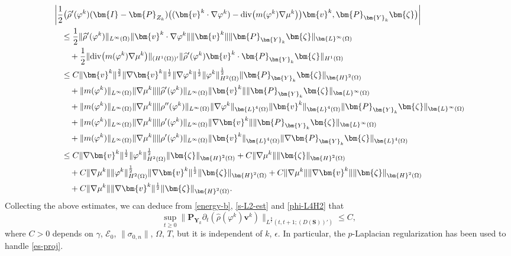 \documentclass[11pt,reqno]{amsart}
\def\be{\begin{equation}}
\def\ee{\end{equation}}
\def\div{\mathrm{div}}
\def\vv{\bm{v}}
\begin{document}
\begin{align}
&\left|\frac12\big(\widehat{\rho}'(\varphi^k)(\bm{I}-\bm{P}_{Z_{k}}) \big((\bm{v}^k\cdot\nabla\varphi^k)-\div \big(m(\varphi^k)\nabla \mu^k\big)\big)\vv^k,\bm{P}_{\bm{Y}_{k}}\bm{\zeta}\big)\right|
\notag\\
&\quad \leq \frac12 \|\widehat{\rho}'(\varphi^k)\|_{L^\infty(\Omega)} \|\bm{v}^k\cdot\nabla\varphi^k \| \|\vv^k\| \|\bm{P}_{\bm{Y}_{k}}\bm{\zeta}  \|_{\bm{L}^\infty(\Omega)}
\notag\\
&\qquad + \frac12 \| \div \big(m(\varphi^k)\nabla \mu^k\big) \|_{(H^1(\Omega))'} \|\widehat{\rho}'(\varphi^k)\vv^k\cdot \bm{P}_{\bm{Y}_{k}}\bm{\zeta}  \|_{H^1(\Omega)}
\notag\\
&\quad \leq C  \|\bm{v}^k\|^\frac32\|\nabla \vv^k\|^\frac12 \|\nabla \varphi^k\|^\frac12\|\varphi^k\|_{H^2(\Omega)}^\frac12 \|\bm{P}_{\bm{Y}_{k}}\bm{\zeta}\|_{\bm{H}^2(\Omega)}
\notag\\
&\qquad +\|m(\varphi^k)\|_{L^\infty(\Omega)}\|\nabla \mu^k\|\|\widehat{\rho}'(\varphi^k)\|_{L^\infty(\Omega)}
\|\vv^k\|\| \bm{P}_{\bm{Y}_{k}}\bm{\zeta}  \|_{\bm{L}^\infty(\Omega)}
\notag\\
&\qquad +\|m(\varphi^k)\|_{L^\infty(\Omega)}\|\nabla \mu^k\|
\|\rho''(\varphi^k)\|_{L^\infty(\Omega)}\|\nabla \varphi^k\|_{\bm{L}^4(\Omega)}\|\vv^k\|_{\bm{L}^4(\Omega)}
\| \bm{P}_{\bm{Y}_{k}}\bm{\zeta}  \|_{\bm{L}^\infty(\Omega)}
\notag\\
&\qquad + \|m(\varphi^k)\|_{L^\infty(\Omega)}\|\nabla \mu^k\|
\|\rho'(\varphi^k)\|_{L^\infty(\Omega)} \|\nabla \vv^k\|
\| \bm{P}_{\bm{Y}_{k}}\bm{\zeta}  \|_{\bm{L}^\infty(\Omega)}
\notag\\
&\qquad + \|m(\varphi^k)\|_{L^\infty(\Omega)}\|\nabla \mu^k\|
\|\rho'(\varphi^k)\|_{L^\infty(\Omega)} \| \vv^k\|_{\bm{L}^4(\Omega)}
\|\nabla \bm{P}_{\bm{Y}_{k}}\bm{\zeta}  \|_{\bm{L}^4(\Omega)}
\notag\\
&\quad \leq C \|\nabla \vv^k\|^\frac12 \|\varphi^k\|_{H^2(\Omega)}^\frac12 \|\bm{\zeta}\|_{\bm{H}^2(\Omega)} + C \|\nabla \mu^k\|\| \bm{\zeta}  \|_{\bm{H}^2(\Omega)}
\notag\\
&\qquad + C \|\nabla \mu^k\|
\|\varphi^k\|_{H^2(\Omega)}^\frac12 \|\nabla \vv^k\|^\frac12
\|\bm{\zeta}  \|_{\bm{H}^2(\Omega)}
+ C\|\nabla \mu^k\|   \|\nabla \vv^k\| \|\bm{\zeta}  \|_{\bm{H}^2(\Omega)}
\notag\\
&\qquad + C\|\nabla \mu^k\| \| \nabla \vv^k\|^\frac12
\|\bm{\zeta}  \|_{\bm{H}^2(\Omega)}.
\label{es-proj}
\end{align}
%
Collecting the above estimates, we can deduce from \eqref{energy-b}, \eqref{s-L2-est} and \eqref{phi-L4H2} that
\be
 \sup_{t\geq 0}\| \bm{P}_{\bm{Y}_{k}}\partial_{t} (\widehat{\rho}(\varphi^k)\bm{v}^{k})\|_{ L^{\frac{8}{7}}(t,t+1;(D(\bm{S}))')}
 \le C,
 \label{vmt2d}
\ee
%
where $C>0$ depends on $\gamma$, $\mathcal{E}_0$, $\|\sigma_{0,n}\|$, $\Omega$, $T$,  but it is independent of $k$, $\epsilon$. In particular, the $p$-Laplacian regularization has been used to handle \eqref{es-proj}.
\end{document}
